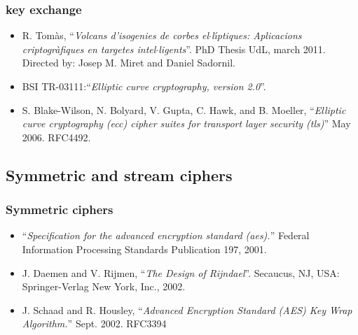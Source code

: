 \documentclass{beamer}
\begin{document}
\begin{frame}
\frametitle{key exchange}
    \begin{itemize}
        \item R. Tom\`as, ``\emph{Volcans d'isogenies de corbes el$\cdot$l\'{\i}ptiques: Aplicacions criptogr\`afiques en targetes intel$\cdot$ligents}''. PhD Thesis UdL, march 2011. Directed by: Josep M. Miret and Daniel Sadornil.\cite{Rosana11}
        \item BSI TR-03111:``\emph{Elliptic curve cryptography, version 2.0}''.\cite{BSI_TR-03111}
        \item S. Blake-Wilson, N. Bolyard, V. Gupta, C. Hawk, and B. Moeller, ``\emph{Elliptic curve cryptography (ecc) cipher suites for transport layer security (tls)}'' May 2006. RFC4492. \cite{rfc4492}

    \end{itemize}
\end{frame}

% 

\subsection{Symmetric and stream ciphers}

\begin{frame}
\frametitle{Symmetric ciphers}
    \begin{itemize}
        \item ``\emph{Specification for the advanced encryption standard (aes).}'' Federal Information Processing Standards Publication 197, 2001.\cite{AES-FIPS}
        \item J. Daemen and V. Rijmen, ``\emph{The Design of Rijndael}''. Secaucus, NJ, USA: Springer-Verlag New York, Inc., 2002. \cite{Daemen:2002:DR:560131}
        \item J. Schaad and R. Housley, ``\emph{Advanced Encryption Standard (AES) Key Wrap Algorithm.}'' Sept. 2002. RFC3394 \cite{rfc3394}
    \end{itemize}
\end{frame}
\end{document}
